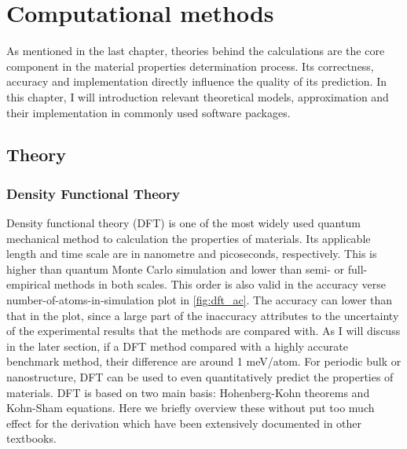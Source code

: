 
\chapter{Computational methods \label{chap:2}}

\ifpdf
    \graphicspath{{Chapter2/Figs/Raster/}{Chapter2/Figs/PDF/}{Chapter2/Figs/}{Chapter2/Figs/Vector/}}
\else
    \graphicspath{{Chapter2/Figs/Vector/}{Chapter2/Figs/}}
\fi

As mentioned in the last chapter, theories behind the calculations are the core component in the material properties determination process. Its correctness, accuracy and implementation directly influence the quality of its prediction. In this chapter, I will introduction relevant theoretical models, approximation and their implementation in commonly used software packages.

\section{Theory}
\subsection{Density Functional Theory}

Density functional theory (DFT) is one of the most widely used quantum mechanical method to calculation the properties of materials. Its applicable length and time scale are in nanometre and picoseconds, respectively. This is higher than quantum Monte Carlo simulation and lower than semi- or full-empirical methods in both scales. This order is also valid in the accuracy verse number-of-atoms-in-simulation plot in \autoref{fig:dft_ac}. The accuracy can lower than that in the plot, since a large part of the inaccuracy attributes to the uncertainty of the experimental results that the methods are compared with\cite{Kirklin2015}. As I will discuss in the later section, if a DFT method compared with a highly accurate benchmark method, their difference are around 1 meV/atom. For periodic bulk or nanostructure, DFT can be used to even quantitatively predict the properties of materials. DFT
is based on two main basis: Hohenberg-Kohn theorems\cite{Hohenberg1964} and Kohn-Sham equations\cite{Kohn1965}. Here we briefly overview these without put too much effect for the derivation which have been extensively documented in other textbooks. 

